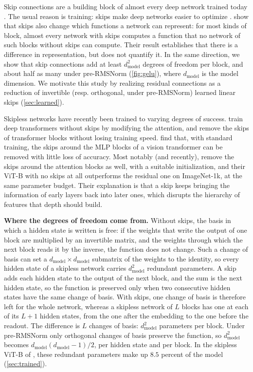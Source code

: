 \documentclass[10pt]{article}
\theoremstyle{definition}
\theoremstyle{remark}
\newcommand{\dm}{d_{\mathrm{model}}}
\newcommand{\para}[1]{\smallskip\noindent\textbf{#1}\hspace{0.5em}}
\begin{document}
Skip connections are a building block of almost every deep network trained today \citep{he2016resnet}. The usual reason is training: skips make deep networks easier to optimize \citep{he2016resnet,balduzzi2017shattered,orhan2018skip}. \citet{mijoski2026worth} show that skips also change which functions a network can represent: for most kinds of block, almost every network with skips computes a function that no network of such blocks without skips can compute. Their result establishes that there is a difference in representation, but does not quantify it. In the same direction, we show that skip connections add at least $\dm^2$ degrees of freedom per block, and about half as many under pre-RMSNorm (\cref{fig:gelu}), where $\dm$ is the model dimension. We motivate this study by realizing residual connections as a reduction of invertible (resp. orthogonal, under pre-RMSNorm) learned linear skips (\cref{sec:learned}).

Skipless networks have recently been trained to varying degrees of success. \citet{he2023shortcuts} train deep transformers without skips by modifying the attention, and \citet{he2024simplifying} remove the skips of transformer blocks without losing training speed. \citet{ji2025always} find that, with standard training, the skips around the MLP blocks of a vision transformer can be removed with little loss of accuracy. Most notably (and recently), \citet{ji2026cutting} remove the skips around the attention blocks as well, with a suitable initialization, and their ViT-B with no skips at all outperforms the residual one on ImageNet-1k, at the same parameter budget. Their explanation is that a skip keeps bringing the information of early layers back into later ones, which disrupts the hierarchy of features that depth should build.

\para{Where the degrees of freedom come from.} Without skips, the basis in which a hidden state is written is free: if the weights that write the output of one block are multiplied by an invertible matrix, and the weights through which the next block reads it by the inverse, the function does not change. Such a change of basis can set a $\dm\times\dm$ submatrix of the weights to the identity, so every hidden state of a skipless network carries $\dm^2$ redundant parameters. A skip adds each hidden state to the output of the next block, and the sum is the next hidden state, so the function is preserved only when two consecutive hidden states have the same change of basis. With skips, one change of basis is therefore left for the whole network, whereas a skipless network of $L$ blocks has one at each of its $L+1$ hidden states, from the one after the embedding to the one before the readout. The difference is $L$ changes of basis: $\dm^2$ parameters per block. Under pre-RMSNorm only orthogonal changes of basis preserve the function, so $\dm^2$ becomes $\dm(\dm-1)/2$, per hidden state and per block. In the skipless ViT-B of \citet{ji2026cutting}, these redundant parameters make up $8.5$ percent of the model (\cref{sec:trained}).
\end{document}
